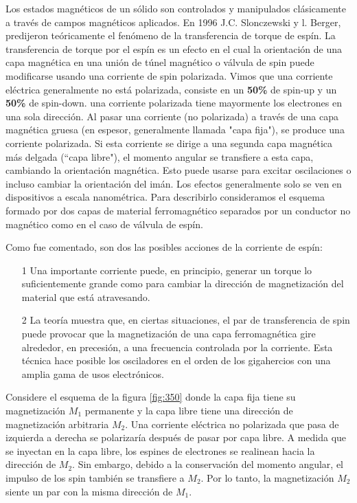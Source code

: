 Los estados magnéticos de un sólido son controlados y manipulados clásicamente a través de campos magnéticos aplicados. En 1996 J.C. Slonczewski y l. Berger, predijeron teóricamente el fenómeno de la transferencia de torque de espín. La transferencia de torque por el espín es un efecto en el cual la orientación de una capa magnética en una unión de túnel magnético o válvula de spin puede modificarse usando una corriente de spin polarizada. Vimos que una corriente eléctrica generalmente no está polarizada, consiste en un \textbf{50\%} de spin-up y un \textbf{50\%} de spin-down. una corriente polarizada tiene mayormente los electrones en una sola dirección. Al pasar una corriente (no polarizada) a través de una capa magnética gruesa (en espesor, generalmente llamada "capa fija"), se produce una corriente polarizada. Si esta corriente se dirige a una segunda capa magnética más delgada (“capa libre"), el momento angular se transfiere a esta capa, cambiando la orientación magnética. Esto puede usarse para excitar oscilaciones o incluso cambiar la orientación del imán. Los efectos generalmente solo se ven en dispositivos a escala nanométrica. Para describirlo consideramos el esquema formado por dos capas de material ferromagnético separados por un conductor no magnético como en el caso de válvula de espín.

Como fue comentado, son dos las posibles acciones de la corriente de espín:

\begin{itemize}
	\item[1] Una importante corriente puede, en principio, generar un torque lo suficientemente grande como para cambiar la dirección de magnetización del material que está atravesando.
	 
	\item[2] La teoría muestra que, en ciertas situaciones, el par de transferencia de spin puede provocar que la magnetización de una capa ferromagnética gire alrededor, en precesión, a una frecuencia controlada por la corriente. Esta técnica hace posible los osciladores en el orden de los gigahercios con una amplia gama de usos electrónicos.

\end{itemize}

Considere el esquema de la figura \ref{fig:350} donde la capa fija tiene su magnetización $M_{1}$ permanente y la capa libre tiene una dirección de magnetización arbitraria $M_{2}$. Una corriente eléctrica no polarizada que pasa de izquierda a derecha se polarizaría después de pasar por capa libre. A medida que se inyectan en la capa libre, los espines de electrones se realinean hacia la dirección de $M_{2}$. Sin embargo, debido a la conservación del momento angular, el impulso de los spin también se transfiere a $M_{2}$. Por lo tanto, la magnetización $M_{2}$ siente un par con la misma dirección de $M_{1}$.

